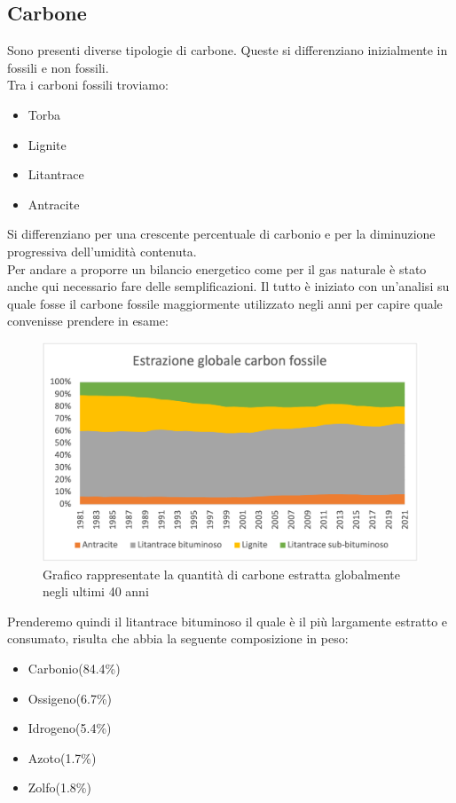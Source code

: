 \subsection{Carbone}
Sono presenti diverse tipologie di carbone. Queste si differenziano inizialmente in fossili e non fossili.\\
Tra i carboni fossili troviamo:
\begin{itemize}
    \item Torba
    \item Lignite
    \item Litantrace
    \item Antracite
\end{itemize}
Si differenziano per una crescente percentuale di carbonio e per la diminuzione progressiva dell'umidità contenuta.\\
Per andare a proporre un bilancio energetico come per il gas naturale è stato anche qui necessario fare delle semplificazioni. Il tutto è iniziato con un'analisi su quale fosse il carbone fossile maggiormente utilizzato negli anni per capire quale convenisse prendere in esame:\cite{EIA-Statistics-World}\\
\begin{figure}[H]
    \centering
    \includegraphics[height=0.6\textwidth]{res/cap 2/Grafico carbone}
    \caption{Grafico rappresentate la quantità di carbone estratta globalmente negli ultimi 40 anni}
\end{figure}\noindent
Prenderemo quindi il litantrace bituminoso il quale è il più largamente estratto e consumato, risulta che abbia la seguente composizione in peso:\cite{Composizione-antracite}\\
\begin{itemize}
    \item Carbonio(84.4\%)
    \item Ossigeno(6.7\%)
    \item Idrogeno(5.4\%)
    \item Azoto(1.7\%)
    \item Zolfo(1.8\%)
\end{itemize}




